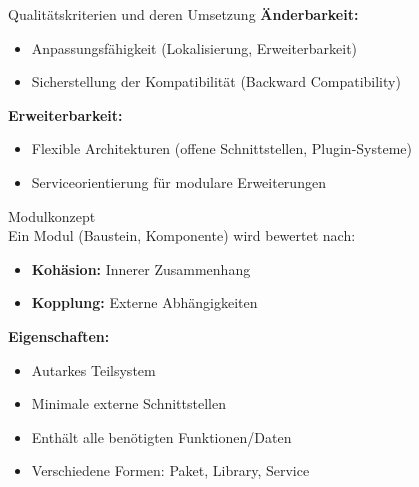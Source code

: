 \begin{corollary}{Qualitätskriterien und deren Umsetzung}
\textbf{Änderbarkeit:}
\begin{itemize}
    \item Anpassungsfähigkeit (Lokalisierung, Erweiterbarkeit)
    \item Sicherstellung der Kompatibilität (Backward Compatibility)
\end{itemize}

\textbf{Erweiterbarkeit:}
\begin{itemize}
    \item Flexible Architekturen (offene Schnittstellen, Plugin-Systeme)
    \item Serviceorientierung für modulare Erweiterungen
\end{itemize}
\end{corollary}






\begin{concept}{Modulkonzept}\\
Ein Modul (Baustein, Komponente) wird bewertet nach:
\begin{itemize}
    \item \textbf{Kohäsion:} Innerer Zusammenhang
    \item \textbf{Kopplung:} Externe Abhängigkeiten
\end{itemize}

\textbf{Eigenschaften:}
\begin{itemize}
    \item Autarkes Teilsystem
    \item Minimale externe Schnittstellen
    \item Enthält alle benötigten Funktionen/Daten
    \item Verschiedene Formen: Paket, Library, Service
\end{itemize}
\end{concept}

